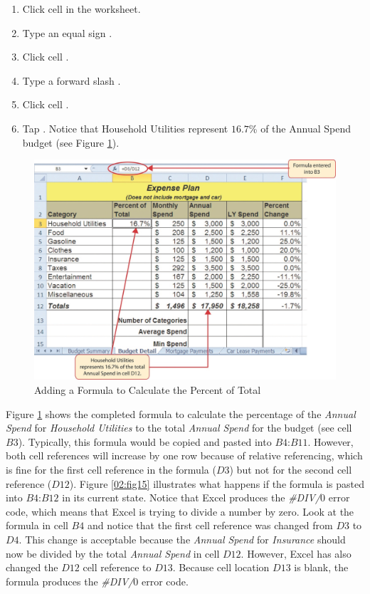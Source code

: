 \begin{enumbox}
	\begin{enumerate}
		\item Click cell  in the  worksheet.
		\item Type an equal sign \fmtTyping{=}.
		\item Click cell .
		\item Type a forward slash \fmtTyping{/}.
		\item Click cell .
		\item Tap . Notice that Household Utilities represent $ 16.7$\% of the Annual Spend budget (see Figure \ref{02:fig14}).
	\end{enumerate}
\end{enumbox}

\begin{figure}[H]
	\centering
	\includegraphics[width=\maxwidth{.95\linewidth}]{gfx/ch02_fig14}
	\caption{Adding a Formula to Calculate the Percent of Total}
	\label{02:fig14}
\end{figure}

Figure \ref{02:fig14} shows the completed formula to calculate the percentage of the \textit{Annual Spend} for \textit{Household Utilities} to the total \textit{Annual Spend} for the budget (see cell \textit{$ B3 $}). Typically, this formula would be copied and pasted into $ B4 $:$ B11 $. However, both cell references will increase by one row because of relative referencing, which is fine for the first cell reference in the formula ($ D3 $) but not for the second cell reference ($ D12 $). Figure \ref{02:fig15} illustrates what happens if the formula is pasted into $ B4 $:$ B12 $ in its current state. Notice that Excel produces the \textit{\#DIV/$ 0 $} error code, which means that Excel is trying to divide a number by zero. Look at the formula in cell $ B4 $ and notice that the first cell reference was changed from $ D3 $ to $ D4 $. This change is acceptable because the \textit{Annual Spend} for \textit{Insurance} should now be divided by the total \textit{Annual Spend} in cell $ D12 $. However, Excel has also changed the $ D12 $ cell reference to $ D13 $. Because cell location $ D13 $ is blank, the formula produces the \textit{\#DIV/$ 0 $} error code.

